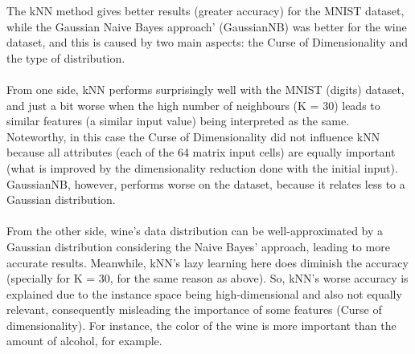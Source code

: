 \documentclass{article}
\begin{document}
The kNN method gives better results (greater accuracy) for the MNIST dataset, while the Gaussian Naive Bayes approach' (GaussianNB) was better for the wine dataset, and this is caused by two main aspects: the Curse of Dimensionality and the type of distribution.
\\
\\
From one side, kNN performs surprisingly well with the MNIST (digits) dataset, and just a bit worse when the high number of neighbours (K = 30) leads to similar features (a similar input value) being interpreted as the same. Noteworthy, in this case the Curse of Dimensionality did not influence kNN because all attributes (each of the 64 matrix input cells) are equally important (what is improved by the dimensionality reduction done with the initial input). GaussianNB, however, performs worse on the dataset, because it relates less to a Gaussian distribution. 
\\
\\
From the other side, wine's data distribution can be well-approximated by a Gaussian distribution considering the Naive Bayes' approach, leading to more accurate results. Meanwhile, kNN's lazy learning here does diminish the accuracy (specially for K = 30, for the same reason as above). So, kNN's worse accuracy is explained due to the instance space being high-dimensional and also not equally relevant, consequently misleading the importance of some features (Curse of dimensionality). For instance, the color of the wine is more important than the amount of alcohol, for example.










\newpage
\end{document}
